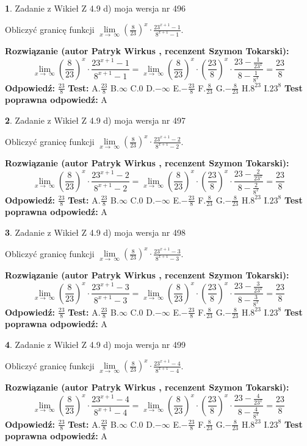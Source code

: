 \documentclass[12pt, a4paper]{article}
\theoremstyle{definition} %
\newtheorem{zad}{}
\newcommand{\zadStart}[1]{\begin{zad}#1\newline}
\newcommand{\zadStop}{\end{zad}}
\newcommand{\rozwStart}[2]{\noindent \textbf{Rozwiązanie (autor #1 , recenzent #2): }\newline}
\newcommand{\rozwStop}{\newline}
\newcommand{\odpStart}{\noindent \textbf{Odpowiedź:}\newline}
\newcommand{\odpStop}{\newline}
\newcommand{\testStart}{\noindent \textbf{Test:}\newline}
\newcommand{\testStop}{\newline}
\newcommand{\kluczStart}{\noindent \textbf{Test poprawna odpowiedź:}\newline}
\newcommand{\kluczStop}{\newline}
\begin{document}
\zadStart{Zadanie z Wikieł Z 4.9 d) moja wersja nr 496}


Obliczyć granicę funkcji  $\lim\limits_{x\to\ \infty}(\frac{8}{23})^{x}\cdot\frac{23^{x+1}-1}{8^{x+1}-1}$.
\zadStop
\rozwStart{Patryk Wirkus}{Szymon Tokarski}
$$\lim\limits_{x\to\ \infty}(\frac{8}{23})^{x}\cdot\frac{23^{x+1}-1}{8^{x+1}-1}=\lim\limits_{x\to\ \infty}(\frac{8}{23})^{x}\cdot(\frac{23}{8})^{x} \cdot \frac{23-\frac{1}{23^{x}}}{8-\frac{1}{8^{x}}} = \frac{23}{8}$$
\rozwStop
\odpStart
$\frac{23}{8}$
\odpStop
\testStart
A.$\frac{23}{8}$ B.$\infty$ C.$0$ D.$-\infty$ E.$-\frac{23}{8}$
F.$\frac{8}{23}$ G.$-\frac{8}{23}$
H.$8^{23}$
I.$23^{8}$
\testStop
\kluczStart
A
\kluczStop



\zadStart{Zadanie z Wikieł Z 4.9 d) moja wersja nr 497}


Obliczyć granicę funkcji  $\lim\limits_{x\to\ \infty}(\frac{8}{23})^{x}\cdot\frac{23^{x+1}-2}{8^{x+1}-2}$.
\zadStop
\rozwStart{Patryk Wirkus}{Szymon Tokarski}
$$\lim\limits_{x\to\ \infty}(\frac{8}{23})^{x}\cdot\frac{23^{x+1}-2}{8^{x+1}-2}=\lim\limits_{x\to\ \infty}(\frac{8}{23})^{x}\cdot(\frac{23}{8})^{x} \cdot \frac{23-\frac{2}{23^{x}}}{8-\frac{2}{8^{x}}} = \frac{23}{8}$$
\rozwStop
\odpStart
$\frac{23}{8}$
\odpStop
\testStart
A.$\frac{23}{8}$ B.$\infty$ C.$0$ D.$-\infty$ E.$-\frac{23}{8}$
F.$\frac{8}{23}$ G.$-\frac{8}{23}$
H.$8^{23}$
I.$23^{8}$
\testStop
\kluczStart
A
\kluczStop



\zadStart{Zadanie z Wikieł Z 4.9 d) moja wersja nr 498}


Obliczyć granicę funkcji  $\lim\limits_{x\to\ \infty}(\frac{8}{23})^{x}\cdot\frac{23^{x+1}-3}{8^{x+1}-3}$.
\zadStop
\rozwStart{Patryk Wirkus}{Szymon Tokarski}
$$\lim\limits_{x\to\ \infty}(\frac{8}{23})^{x}\cdot\frac{23^{x+1}-3}{8^{x+1}-3}=\lim\limits_{x\to\ \infty}(\frac{8}{23})^{x}\cdot(\frac{23}{8})^{x} \cdot \frac{23-\frac{3}{23^{x}}}{8-\frac{3}{8^{x}}} = \frac{23}{8}$$
\rozwStop
\odpStart
$\frac{23}{8}$
\odpStop
\testStart
A.$\frac{23}{8}$ B.$\infty$ C.$0$ D.$-\infty$ E.$-\frac{23}{8}$
F.$\frac{8}{23}$ G.$-\frac{8}{23}$
H.$8^{23}$
I.$23^{8}$
\testStop
\kluczStart
A
\kluczStop



\zadStart{Zadanie z Wikieł Z 4.9 d) moja wersja nr 499}


Obliczyć granicę funkcji  $\lim\limits_{x\to\ \infty}(\frac{8}{23})^{x}\cdot\frac{23^{x+1}-4}{8^{x+1}-4}$.
\zadStop
\rozwStart{Patryk Wirkus}{Szymon Tokarski}
$$\lim\limits_{x\to\ \infty}(\frac{8}{23})^{x}\cdot\frac{23^{x+1}-4}{8^{x+1}-4}=\lim\limits_{x\to\ \infty}(\frac{8}{23})^{x}\cdot(\frac{23}{8})^{x} \cdot \frac{23-\frac{4}{23^{x}}}{8-\frac{4}{8^{x}}} = \frac{23}{8}$$
\rozwStop
\odpStart
$\frac{23}{8}$
\odpStop
\testStart
A.$\frac{23}{8}$ B.$\infty$ C.$0$ D.$-\infty$ E.$-\frac{23}{8}$
F.$\frac{8}{23}$ G.$-\frac{8}{23}$
H.$8^{23}$
I.$23^{8}$
\testStop
\kluczStart
A
\kluczStop
\end{document}
